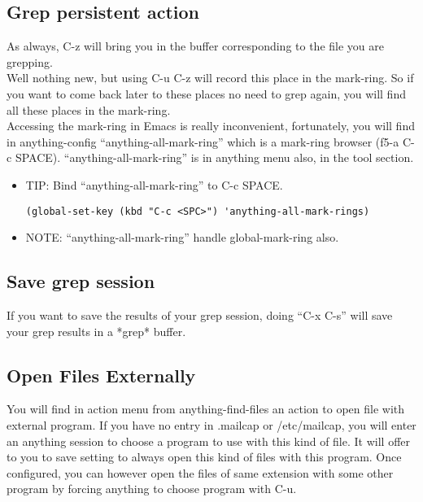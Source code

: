 \documentclass[a4paper,11pt]{article}
\begin{document}
\subsection{Grep persistent action}
\label{sec:grep-pers-acti}
As always, C-z will bring you in the buffer corresponding to the file you are grepping. \\
Well nothing new, but using C-u C-z will record this place in the mark-ring.
So if you want to come back later to these places no need to grep again, you will find all these 
places in the mark-ring.\\
Accessing the mark-ring in Emacs is really inconvenient, fortunately, you will find in anything-config 
``anything-all-mark-ring'' which is a mark-ring browser (f5-a C-c SPACE).
\newpage
``anything-all-mark-ring'' is in anything menu also, in the tool section.\\

\begin{itemize}
\item TIP: Bind ``anything-all-mark-ring'' to C-c SPACE.
\begin{verbatim}
(global-set-key (kbd "C-c <SPC>") 'anything-all-mark-rings)
\end{verbatim}
\end{itemize}

\begin{itemize}
\item NOTE: ``anything-all-mark-ring'' handle global-mark-ring also.
\end{itemize}

\subsection{Save grep session}
\label{sec:save-grep-session}
If you want to save the results of your grep session, doing ``C-x C-s'' will save your grep results
in a *grep* buffer. 

\subsection{Open Files Externally}
\label{sec:open-files-extern}
You will find in action menu from anything-find-files an action to open file with external program.
If you have no entry in .mailcap or /etc/mailcap, you will enter an anything session to choose a program
to use with this kind of file.
It will offer to you to save setting to always open this kind of files with this program.
Once configured, you can however open the files of same extension with some other program by forcing anything
to choose program with C-u.\\
\end{document}
